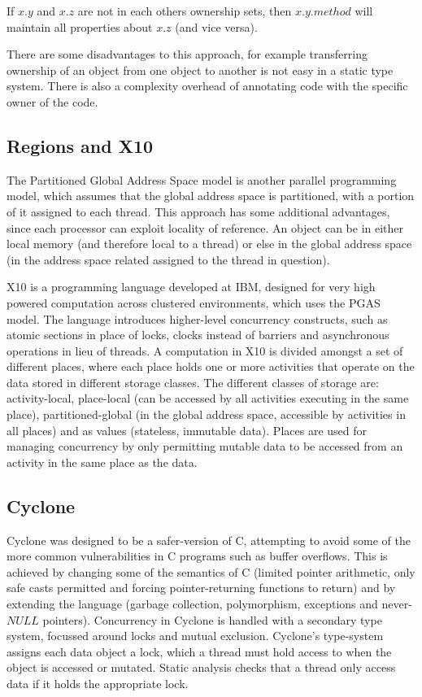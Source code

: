 \documentclass[11pt,a4paper]{report}
\begin{document}
If $x.y$ and $x.z$ are not in each others ownership sets, then $x.y.method$ will maintain
all properties about $x.z$ (and vice versa).

There are some disadvantages to this approach, for example transferring ownership of an object from one object to another is not easy in a static type system\cite{clarke1998}.
There is also a complexity overhead of annotating code with the specific owner of the code.

\subsection{Regions and X10}
\label{sec:regions}

The Partitioned Global Address Space model\cite{pgas} is another parallel programming model, which assumes that the global address space is partitioned, with a portion of it assigned to each thread.
This approach has some additional advantages, since each processor can exploit locality of reference.
An object can be in either local memory (and therefore local to a thread) or else in the global address space (in the address space related assigned to the thread in question).

X10\cite{x10} is a programming language developed at IBM, designed for very high powered computation across clustered environments, which uses the PGAS model.
The language introduces higher-level concurrency constructs, such as atomic sections in place of locks, clocks instead of barriers and asynchronous operations in lieu of threads.
A computation in X10 is divided amongst a set of different places, where each place holds one or more activities that operate on the data stored in different storage classes.
The different classes of storage are: activity-local, place-local (can be accessed by all activities executing in the same place), partitioned-global (in the global address space, accessible by activities in all places) and as values (stateless, immutable data)\cite{x10-places}.
Places are used for managing concurrency by only permitting mutable data to be accessed from an activity in the same place as the data\cite{charles2005x10}.

\subsection{Cyclone}
\label{sec:cyclone}

Cyclone\cite{grossman2005cyclone} was designed to be a safer-version of C, attempting to avoid some of the more common vulnerabilities in C programs such as buffer overflows.
This is achieved by changing some of the semantics of C (limited pointer arithmetic, only safe casts permitted and forcing pointer-returning functions to return) and by extending the language (garbage collection, polymorphism, exceptions and never-$NULL$ pointers).
Concurrency in Cyclone is handled with a secondary type system, focussed around locks and mutual exclusion.
Cyclone's type-system assigns each data object a lock, which a thread must hold access to when the object is accessed or mutated.
Static analysis checks that a thread only access data if it holds the appropriate lock.
\end{document}
